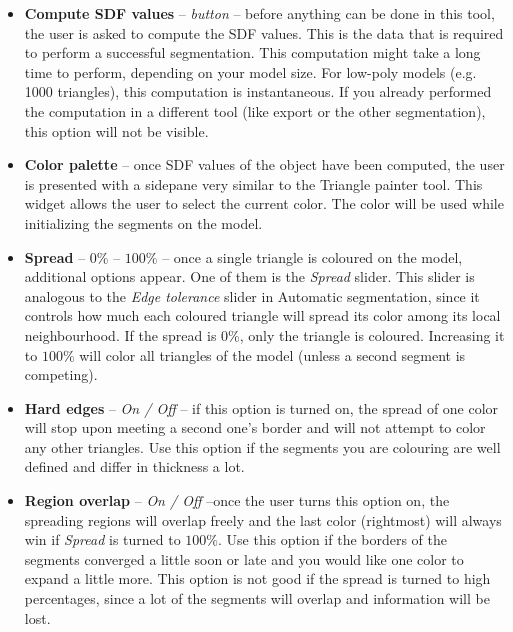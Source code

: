 \begin{itemize}

\item \textbf{Compute SDF values} -- \textit{button} -- before anything can be done in this tool, the user is asked to compute the SDF values. This is the data that is required to perform a successful segmentation. This computation might take a long time to perform, depending on your model size. For low-poly models (e.g. 1000 triangles), this computation is instantaneous. If you already performed the computation in a different tool (like export or the other segmentation), this option will not be visible.

\item \textbf{Color palette} -- once SDF values of the object have been computed, the user is presented with a sidepane very similar to the Triangle painter tool. This widget allows the user to select the current color. The color will be used while initializing the segments on the model.

\item \textbf{Spread} -- $0\%$ -- $100\%$ -- once a single triangle is coloured on the model, additional options appear. One of them is the \textit{Spread} slider. This slider is analogous to the \textit{Edge tolerance} slider in Automatic segmentation, since it controls how much each coloured triangle will spread its color among its local neighbourhood. If the spread is $0\%$, only the triangle is coloured. Increasing it to $100\%$ will color all triangles of the model (unless a second segment is competing).

\item \textbf{Hard edges} -- \textit{On / Off} -- if this option is turned on, the spread of one color will stop upon meeting a second one's border and will not attempt to color any other triangles. Use this option if the segments you are colouring are well defined and differ in thickness a lot.

\item \textbf{Region overlap} -- \textit{On / Off} --once the user turns this option on, the spreading regions will overlap freely and the last color (rightmost) will always win if \textit{Spread} is turned to $100\%$. Use this option if the borders of the segments converged a little soon or late and you would like one color to expand a little more. This option is not good if the spread is turned to high percentages, since a lot of the segments will overlap and information will be lost.

\end{itemize}

